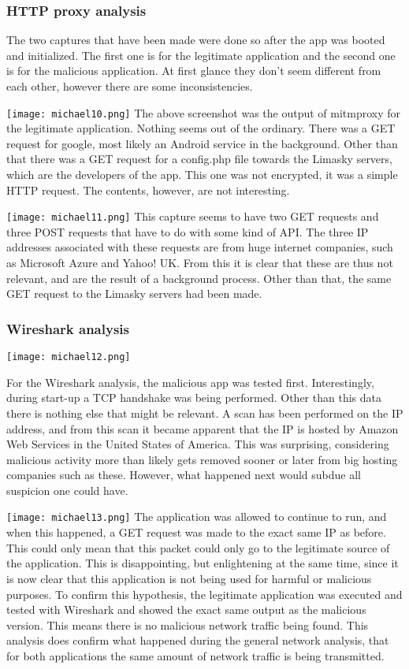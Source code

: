 \subsubsection{HTTP proxy analysis}
The two captures that have been made were done so after the app was booted and initialized. The first one is for the legitimate application and the second one is for the malicious application. At first glance they don’t seem different from each other, however there are some inconsistencies.

\texttt{[image: michael10.png]}
The above screenshot was the output of mitmproxy for the legitimate application. Nothing seems out of the ordinary. There was a GET request for google, most likely an Android service in the background. Other than that there was a GET request for a config.php file towards the Limasky servers, which are the developers of the app. This one was not encrypted, it was a simple HTTP request. The contents, however, are not interesting.

\texttt{[image: michael11.png]}
This capture seems to have two GET requests and three POST requests that have to do with some kind of API. The three IP addresses associated with these requests are from huge internet companies, such as Microsoft Azure and Yahoo! UK. From this it is clear that these are thus not relevant, and are the result of a background process. Other than that, the same GET request to the Limasky servers had been made.
\subsubsection{Wireshark analysis}

\texttt{[image: michael12.png]}

For the Wireshark analysis, the malicious app was tested first. Interestingly, during start-up a TCP handshake was being performed. Other than this data there is nothing else that might be relevant. A scan has been performed on the IP address, and from this scan it became apparent that the IP is hosted by Amazon Web Services in the United States of America. This was surprising, considering malicious activity more than likely gets removed sooner or later from big hosting companies such as these. However, what happened next would subdue all suspicion one could have.

\texttt{[image: michael13.png]}
The application was allowed to continue to run, and when this happened, a GET request was made to the exact same IP as before. This could only mean that this packet could only go to the legitimate source of the application. This is disappointing, but enlightening at the same time, since it is now clear that this application is not being used for harmful or malicious purposes. To confirm this hypothesis, the legitimate application was executed and tested with Wireshark and showed the exact same output as the malicious version. This means there is no malicious network traffic being found. This analysis does confirm what happened during the general network analysis, that for both applications the same amount of network traffic is being transmitted.
